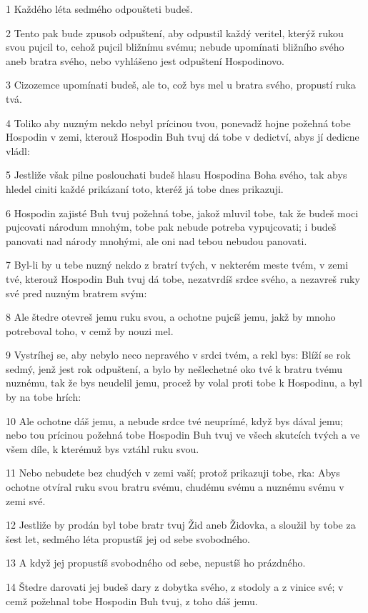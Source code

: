 \par 1 Každého léta sedmého odpoušteti budeš.
\par 2 Tento pak bude zpusob odpuštení, aby odpustil každý veritel, kterýž rukou svou pujcil to, cehož pujcil bližnímu svému; nebude upomínati bližního svého aneb bratra svého, nebo vyhlášeno jest odpuštení Hospodinovo.
\par 3 Cizozemce upomínati budeš, ale to, což bys mel u bratra svého, propustí ruka tvá.
\par 4 Toliko aby nuzným nekdo nebyl prícinou tvou, ponevadž hojne požehná tobe Hospodin v zemi, kterouž Hospodin Buh tvuj dá tobe v dedictví, abys jí dedicne vládl:
\par 5 Jestliže však pilne poslouchati budeš hlasu Hospodina Boha svého, tak abys hledel ciniti každé prikázaní toto, kteréž já tobe dnes prikazuji.
\par 6 Hospodin zajisté Buh tvuj požehná tobe, jakož mluvil tobe, tak že budeš moci pujcovati národum mnohým, tobe pak nebude potreba vypujcovati; i budeš panovati nad národy mnohými, ale oni nad tebou nebudou panovati.
\par 7 Byl-li by u tebe nuzný nekdo z bratrí tvých, v nekterém meste tvém, v zemi tvé, kterouž Hospodin Buh tvuj dá tobe, nezatvrdíš srdce svého, a nezavreš ruky své pred nuzným bratrem svým:
\par 8 Ale štedre otevreš jemu ruku svou, a ochotne pujcíš jemu, jakž by mnoho potreboval toho, v cemž by nouzi mel.
\par 9 Vystríhej se, aby nebylo neco nepravého v srdci tvém, a rekl bys: Blíží se rok sedmý, jenž jest rok odpuštení, a bylo by nešlechetné oko tvé k bratru tvému nuznému, tak že bys neudelil jemu, procež by volal proti tobe k Hospodinu, a byl by na tobe hrích:
\par 10 Ale ochotne dáš jemu, a nebude srdce tvé neuprímé, když bys dával jemu; nebo tou prícinou požehná tobe Hospodin Buh tvuj ve všech skutcích tvých a ve všem díle, k kterémuž bys vztáhl ruku svou.
\par 11 Nebo nebudete bez chudých v zemi vaší; protož prikazuji tobe, rka: Abys ochotne otvíral ruku svou bratru svému, chudému svému a nuznému svému v zemi své.
\par 12 Jestliže by prodán byl tobe bratr tvuj Žid aneb Židovka, a sloužil by tobe za šest let, sedmého léta propustíš jej od sebe svobodného.
\par 13 A když jej propustíš svobodného od sebe, nepustíš ho prázdného.
\par 14 Štedre darovati jej budeš dary z dobytka svého, z stodoly a z vinice své; v cemž požehnal tobe Hospodin Buh tvuj, z toho dáš jemu.
